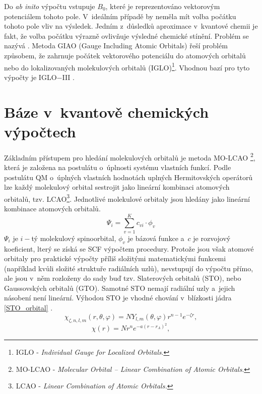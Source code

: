 \documentclass[
digital, %
table,   %
lof,     %
lot,     %
oneside,
]{fithesis3}
\begin{document}
Do \textit{ab inito} výpočtu vstupuje $B_0$, které je reprezentováno vektorovým potenciálem tohoto pole. V~ideálním případě by neměla mít volba počátku tohoto pole vliv na výsledek. Jedním z~důsledků aproximace v~kvantové chemii je fakt, že volba počátku výrazně ovlivňuje výsledné chemické stínění. Problém se nazývá . Metoda GIAO \cite{doi:10.1021/jp9529127} (Gauge  Including Atomic Orbitals) řeší problém způsobem, že zahrnuje počátek vektorového potenciálu do atomových orbitalů nebo do lokalizovaných molekulových orbitalů (IGLO)\footnote{IGLO - \textit{Individual Gauge for Localized Orbitals}.}. Vhodnou bazí pro tyto výpočty je IGLO$-$III \cite{Standara2006thesis} \cite{g09}.

\section{Báze v~kvantově chemických výpočtech}
Základním přístupem pro hledání molekulových orbitalů je metoda MO-LCAO \footnote{MO-LCAO - \textit{Molecular Orbital – Linear Combination of Atomic Orbitals}.}, která je založena na postulátu o~úplnosti systému vlastních funkcí. Podle postulátu QM o~úplných vlastních hodnotách uplných Hermitovských operátorů lze každý molekulový orbital sestrojit jako lineární kombinaci atomových orbitalů, tzv. LCAO\footnote{LCAO - \textit{Linear Combination of Atomic Orbitals.}}. Jednotlivé molekulové orbitaly jsou hledány jako lineární kombinace atomových orbitalů.
\begin{equation}
\Psi_i = \sum_{v=1}^{K}c_{vi} \cdot \phi_{v}
\end{equation}
$\Psi_i$ je $i-$tý molekulový spinoorbital, $\phi_{v}$ je bázová funkce a~$c$ je rozvojový koeficient, lterý se získá se SCF výpočtem procedury. Protože jsou však atomové orbitaly pro praktické výpočty příliš složitými matematickými funkcemi (například kvůli složité struktuře radiálních uzlů), nevstupují do výpočtu přímo, ale jsou v~něm rozloženy do sady buď tzv. Slaterových orbitalů (STO), nebo Gaussovských orbitalů (GTO). Samotné STO nemají radiální uzly a~jejich násobení není lineární. Výhodou STO je vhodné chování v~blízkosti jádra \ref{STO_orbital} \cite{jensen2007introduction}.
\begin{equation}
\chi_{\zeta, n, l, m}(r, \theta, \varphi) = NY_{l,m} (\theta, \varphi) r^{n-1} e^{-\zeta r},
\label{STO_orbital}
\end{equation}
\begin{equation}
\chi(r) = Nr^n e^{-a(r-r_A)^2},
\end{equation}
\end{document}
